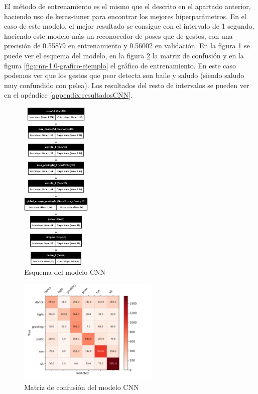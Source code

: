 El método de entrenamiento es el mismo que el descrito en el apartado anterior, haciendo uso de keras-tuner para encontrar los mejores hiperparámetros. En el caso de este modelo, el mejor resultado se consigue con el intervalo de 1 segundo, haciendo este modelo más un reconocedor de poses que de gestos, con una precisión de 0.55879 en entrenamiento y 0.56002 en validación. En la figura \ref{fig:cnn-1.0-ejemplo} se puede ver el esquema del modelo, en la figura \ref{fig:cnn-1.0-matriz-ejemplo} la matriz de confusión y en la figura \ref{fig:cnn-1.0-grafico-ejemplo} el gráfico de entrenamiento. En este caso podemos ver que los gestos que peor detecta son baile y saludo (siendo saludo muy confundido con pelea). Los resultados del resto de intervalos se pueden ver en el apéndice \ref{appendix:resultadosCNN}.
\begin{figure}[H]
    \centering
    \includegraphics[width=0.3\textwidth]{Imagenes/Bitmap/best-cnn1.0.png}
    \caption{Esquema del modelo CNN}
    \label{fig:cnn-1.0-ejemplo}
\end{figure}

\begin{figure}[H]
    \centering
    \includegraphics[width=0.6\textwidth]{Imagenes/Bitmap/CM_best-cnn1.0.png}
    \caption{Matriz de confusión del modelo CNN}
    \label{fig:cnn-1.0-matriz-ejemplo}
\end{figure}

